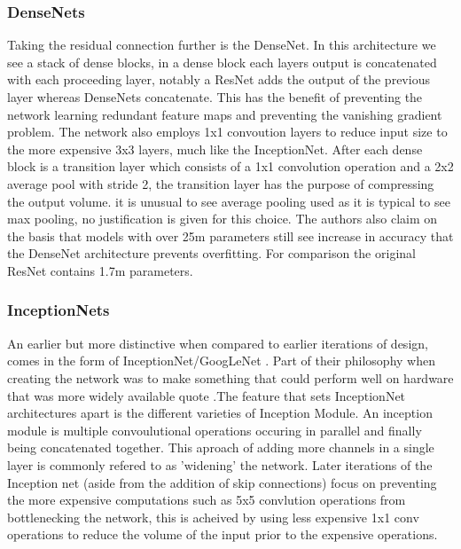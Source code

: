   \subsubsection{DenseNets}
    Taking the residual connection further is the DenseNet. In this architecture we see a stack of dense blocks, in a dense block each layers output is concatenated with each proceeding layer, notably a ResNet adds the output of the previous layer whereas DenseNets concatenate. This has the benefit of preventing the network learning redundant feature maps and preventing the vanishing gradient problem. The network also employs 1x1 convoution layers to reduce input size to the more expensive 3x3 layers, much like the InceptionNet. After each dense block is a transition layer which consists of a 1x1 convolution operation and a 2x2 average pool with stride 2, the transition layer has the purpose of compressing the output volume. it is unusual to see average pooling used as it is typical to see max pooling, no justification is given for this choice. The authors also claim on the basis that models with over 25m parameters still see increase in accuracy that the DenseNet architecture prevents overfitting. For comparison the original ResNet contains 1.7m parameters.
  \subsubsection{InceptionNets}
    An earlier but more distinctive when compared to earlier iterations of design, comes in the form of InceptionNet/GoogLeNet \cite{Szegedy2015}. Part of their philosophy when creating the network was to make something that could perform well on hardware that was more widely available quote \cite{Szegedy2015}.The feature that sets InceptionNet architectures apart is the different varieties of Inception Module. An inception module is multiple convoulutional operations occuring in parallel and finally being concatenated together. This aproach of adding more channels in a single layer is commonly refered to as 'widening' the network. Later iterations of the Inception net (aside from the addition of skip connections) focus on preventing the more expensive computations such as 5x5 convlution operations from bottlenecking the network, this is acheived by using less expensive 1x1 conv operations to reduce the volume of the input prior to the expensive operations.
